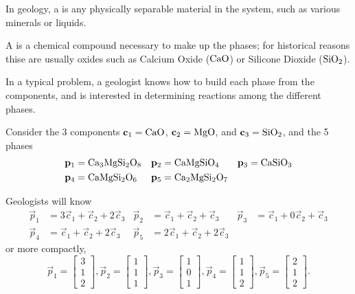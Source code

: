 
\begin{applicationActivities}

\begin{definition}
In geology, a  is any physically separable material in the system, such as various minerals or liquids.

\vspace{1em}

A  is a chemical compound necessary to make up the phases; for historical reasons thise are usually oxides such as Calcium Oxide (${\rm CaO}$) or Silicone Dioxide (${\rm SiO_2}$).

\vspace{1em}

In a typical problem, a geologist knows how to build each phase from the components, and is interested in determining reactions among the different phases.
\end{definition}

\begin{activity}{5}
Consider the 3 components $\vec{c}_1={\rm CaO}$, $\vec{c}_2={\rm MgO}$, and $\vec{c}_3={\rm SiO_2}$, and the 5 phases
\begin{align*}
\vec{p}_1 &= {\rm Ca_3MgSi_2O_8} & \vec{p}_2 &= {\rm CaMgSiO_4} & \vec{p}_3 &= {\rm CaSiO_3} \\
\vec{p}_4 &= {\rm CaMgSi_2O_6} & \vec{p}_5 &= {\rm Ca_2MgSi_2O_7}
\end{align*}

Geologists will know
\begin{align*}
\vec{p}_1 &= 3\vec{c}_1 + \vec{c}_2 + 2 \vec{c}_3 & \vec{p}_2 &= \vec{c}_1 +\vec{c}_2 + \vec{c}_3  &
\vec{p}_3 &= \vec{c}_1 + 0\vec{c}_2 +  \vec{c}_3 \\
\vec{p}_4 &= \vec{c}_1 +\vec{c}_2 + 2\vec{c}_3 &  \vec{p}_5 &= 2\vec{c}_1 + \vec{c}_2 + 2 \vec{c}_3 
\end{align*}
or more compactly,
$$ \vec{p}_1 = \begin{bmatrix} 3 \\ 1 \\ 2 \end{bmatrix},
\vec{p}_2 = \begin{bmatrix} 1 \\ 1 \\ 1 \end{bmatrix},
\vec{p}_3 = \begin{bmatrix} 1 \\ 0 \\ 1 \end{bmatrix},
\vec{p}_4 = \begin{bmatrix} 1 \\ 1 \\ 2 \end{bmatrix},
\vec{p}_5 = \begin{bmatrix} 2 \\ 1 \\ 2 \end{bmatrix}.$$


\end{activity}
\end{applicationActivities}
